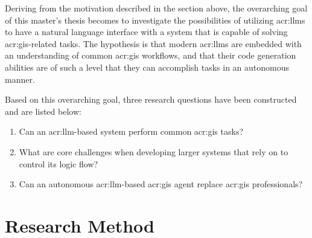 \begin{comment}
For a Specialisation Project, the goal would primarily be to get up to speed with the research field, so the research questions will rather be
limited to exploring what the state-of-the-art is, what methods and data have been used, etc.
A secondary goal of the specialisation is to frame the research questions and goals of the Master's Thesis.
Note that a major difference between the Specialisation Project and the Master's Thesis is that the Master's Thesis work \textit{has\/} to
introduce new research.
Of course the Specialisation Project can also introduce novel work, but there is no such requirement --- and most commonly it does not,
since the core of the project really is to figure out what is ``old'' before you can introduce something which is new.
\end{comment}

Deriving from the motivation described in the section above, the overarching goal of this master's thesis becomes to investigate the possibilities of utilizing \glspl{acr:llm} to have a natural language interface with a system that is capable of solving \acrshort{acr:gis}-related tasks. The hypothesis is that modern \glspl{acr:llm} are embedded with an understanding of common \acrshort{acr:gis} workflows, and that their code generation abilities are of such a level that they can accomplish tasks in an autonomous manner.

Based on this overarching goal, three research questions have been constructed and are listed below:

\begin{enumerate}
    \item Can an \gls{acr:llm}-based system perform common \acrshort{acr:gis} tasks? \label{rq:gis-question-answering}
    \item What are core challenges when developing larger systems that rely on  to control its logic flow? \label{rq:development-challenges}
    \item Can an autonomous \acrshort{acr:llm}-based \acrshort{acr:gis} agent replace \acrshort{acr:gis} professionals? \label{rq:replaing-gis-professionals}
\end{enumerate}

\section{Research Method}
\label{sec:researchMethod}

\begin{comment}
What methodology will you apply to address the goals: theoretic/analytic, model/abstraction or design/experiment?
This section will describe the research methodology applied and the reason for this choice of research methodology.
You should return to the actual choices made in the work and the alternatives in the Discussion chapter.
\end{comment}


